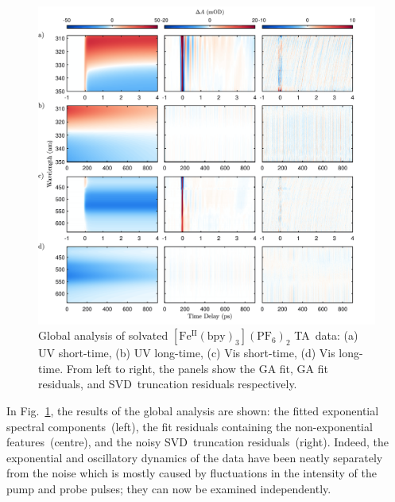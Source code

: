 \begin{figure}[t!]
  \centering
  \includegraphics[width = \textwidth]{Figures/fig_BPY_data_aqueous_resi.pdf}
  \caption[Global analysis of solvated BPY TA~data.]{
    Global analysis of solvated $\mathrm{[Fe^{II}(bpy)_3](PF_6)_2}$ TA~data:
    (a) UV short-time, (b) UV long-time, (c) Vis short-time, (d) Vis long-time.
    From left to right, the panels show
    the GA fit, GA fit residuals, and SVD~truncation residuals respectively.
  }
  \label{fig: BPY-data-aqueous-resi}
\end{figure}
%
In Fig.~\ref{fig: BPY-data-aqueous-resi},
the results of the global analysis are shown:
the fitted exponential spectral components~(left),
the fit residuals containing the non-exponential features~(centre),
and the noisy SVD~truncation residuals~(right).
%
Indeed, the exponential and oscillatory dynamics of the data
have been neatly separately from the noise which is mostly caused by
fluctuations in the intensity of the pump and probe pulses;
they can now be examined independently.

